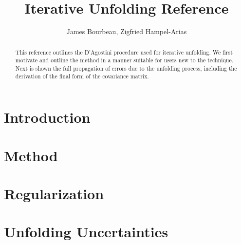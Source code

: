 \documentclass[11pt, letter]{article}
\newcommand\blankpage{%
    \null
    \thispagestyle{empty}%
    \addtocounter{page}{-1}%
    \newpage}
\begin{document}
\titleGP
\afterpage{\blankpage}

\title{Iterative Unfolding Reference}
\author{James Bourbeau, Zigfried Hampel-Arias}
\maketitle


\begin{abstract}

This reference outlines the D'Agostini procedure used for iterative unfolding.
We first motivate and outline the method in a manner suitable for users new to the technique.
Next is shown the full propagation of errors due to the unfolding process, including the derivation
of the final form of the covariance matrix.

\end{abstract}


\tableofcontents
\newpage


\section{Introduction}
\label{introduction_section}
\newpage


\section{Method}\label{unfolding_method_section}

\newpage

\section{Regularization}\label{regularization_section}

\newpage

\section{Unfolding Uncertainties}\label{uncertainties_section}

\newpage
\end{document}
